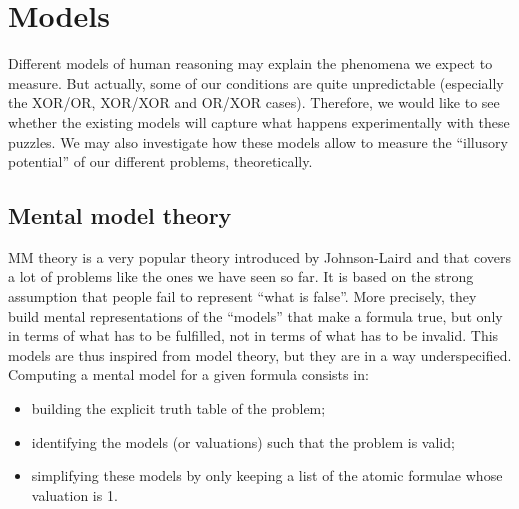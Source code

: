 \documentclass[french]{article}
\begin{document}
\section{Models}
Different models of human reasoning may explain the phenomena we expect to measure. But actually, some of our conditions are quite unpredictable (especially the XOR/OR, XOR/XOR and OR/XOR cases). Therefore, we would like to see whether the existing models will capture what happens experimentally with these puzzles. We may also investigate how these models allow to measure the ``illusory potential'' of our different problems, theoretically.
\subsection{Mental model theory}
MM theory is a very popular theory introduced by Johnson-Laird and that covers a lot of problems like the ones we have seen so far. It is based on the strong assumption that people fail to represent ``what is false''. More precisely, they build mental representations of the ``models'' that make a formula true, but only in terms of what has to be fulfilled, not in terms of what has to be invalid. This models are thus inspired from model theory, but they are in a way underspecified. Computing a mental model for a given formula consists in:
\begin{itemize}
	\item building the explicit truth table of the problem;
	\item identifying the models (or valuations) such that the problem is valid;
	\item simplifying these models by only keeping a list of the atomic formulae whose valuation is 1.
\end{itemize}
\end{document}
